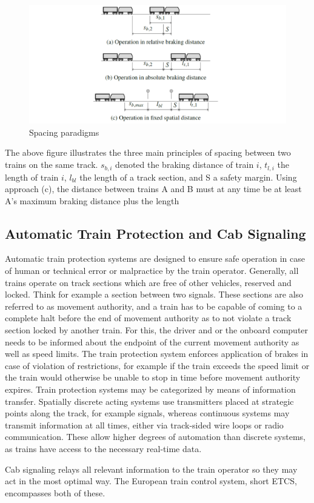 \begin{figure}[H]
	\centering
	\includegraphics[width=\linewidth]{./pic/abstaende}
	\caption{Spacing paradigms}
	\label{fig:train_spacing}
\end{figure}

\par\noindent
The above figure illustrates the three main principles of spacing between two trains on the same track. $s_{b,i}$ denoted the braking distance of train $i$, $t_{l,i}$ the length of train $i$, $l_{bl}$ the length of a track section, and S a safety margin. Using approach (c), the distance between trains A and B must at any time be at least A's maximum braking distance plus the length 

\subsection{Automatic Train Protection and Cab Signaling}
\label{sec:ATPCS}
\par\noindent
Automatic train protection systems are designed to ensure safe operation in case of human or technical error or malpractice by the train operator. Generally, all trains operate on track sections which are free of other vehicles, reserved and locked. Think for example a section between two signals. These sections are also referred to as movement authority, and a train has to be capable of coming to a complete halt before the end of movement authority as to not violate a track section locked by another train. For this, the driver and or the onboard computer needs to be informed about the endpoint of the current movement authority as well as speed limits. The train protection system enforces application of brakes in case of violation of restrictions, for example if the train exceeds the speed limit or the train would otherwise be unable to stop in time before movement authority expires. Train protection systems may be categorized by means of information transfer. Spatially discrete acting systems use transmitters placed at strategic points along the track, for example signals, whereas continuous systems may transmit information at all times, either via track-sided wire loops or radio communication. These allow higher degrees of automation than discrete systems, as trains have access to the necessary real-time data.
\par
Cab signaling relays all relevant information to the train operator so they may act in the most optimal way. The European train control system, short ETCS, encompasses both of these.

